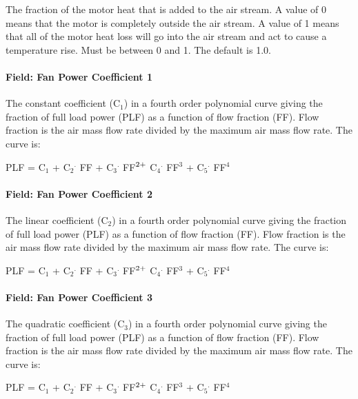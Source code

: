 The fraction of the motor heat that is added to the air stream. A value of 0 means that the motor is completely outside the air stream. A value of 1 means that all of the motor heat loss will go into the air stream and act to cause a temperature rise. Must be between 0 and 1. The default is 1.0.

\paragraph{Field: Fan Power Coefficient 1}\label{field-fan-power-coefficient-1}

The constant coefficient (C\(_{1}\)) in a fourth order polynomial curve giving the fraction of full load power (PLF) as a function of flow fraction (FF). Flow fraction is the air mass flow rate divided by the maximum air mass flow rate. The curve is:

PLF = C\(_{1}\) + C\(_{2}\)\(^{.}\) FF + C\(_{3}\)\(^{.}\) FF\(^{2\\ +}\) C\(_{4}\)\(^{.}\) FF\(^{3}\) + C\(_{5}\)\(^{.}\) FF\(^{4}\)

\paragraph{Field: Fan Power Coefficient 2}\label{field-fan-power-coefficient-2}

The linear coefficient (C\(_{2}\)) in a fourth order polynomial curve giving the fraction of full load power (PLF) as a function of flow fraction (FF). Flow fraction is the air mass flow rate divided by the maximum air mass flow rate. The curve is:

PLF = C\(_{1}\) + C\(_{2}\)\(^{.}\) FF + C\(_{3}\)\(^{.}\) FF\(^{2\\ +}\) C\(_{4}\)\(^{.}\) FF\(^{3}\) + C\(_{5}\)\(^{.}\) FF\(^{4}\)

\paragraph{Field: Fan Power Coefficient 3}\label{field-fan-power-coefficient-3}

The quadratic coefficient (C\(_{3}\)) in a fourth order polynomial curve giving the fraction of full load power (PLF) as a function of flow fraction (FF). Flow fraction is the air mass flow rate divided by the maximum air mass flow rate. The curve is:

PLF = C\(_{1}\) + C\(_{2}\)\(^{.}\) FF + C\(_{3}\)\(^{.}\) FF\(^{2\\ +}\) C\(_{4}\)\(^{.}\) FF\(^{3}\) + C\(_{5}\)\(^{.}\) FF\(^{4}\)

